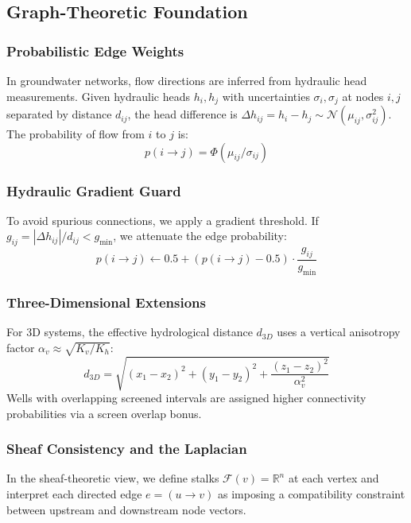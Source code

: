 \documentclass[12pt,a4paper]{article}
\theoremstyle{plain}
\theoremstyle{definition}
\theoremstyle{remark}
\begin{document}
\subsection{Graph-Theoretic Foundation}\label{sec:graph_foundation}

\subsubsection{Probabilistic Edge Weights}
In groundwater networks, flow directions are inferred from hydraulic head measurements. Given hydraulic heads $h_i, h_j$ with uncertainties $\sigma_i, \sigma_j$ at nodes $i, j$ separated by distance $d_{ij}$, the head difference is $\Delta h_{ij} = h_i - h_j \sim \mathcal{N}(\mu_{ij}, \sigma_{ij}^2)$. The probability of flow from $i$ to $j$ is:
\begin{equation}\label{eq:edge_probability}
	p(i \to j) = \Phi(\mu_{ij} / \sigma_{ij})
\end{equation}

\subsubsection{Hydraulic Gradient Guard}
To avoid spurious connections, we apply a gradient threshold. If $g_{ij} = |\Delta h_{ij}|/d_{ij} < g_{\min}$, we attenuate the edge probability:
\begin{equation}\label{eq:gradient_guard}
	p(i \to j) \leftarrow 0.5 + (p(i \to j) - 0.5) \cdot \frac{g_{ij}}{g_{\min}}
\end{equation}

\subsubsection{Three-Dimensional Extensions}
For 3D systems, the effective hydrological distance $d_{3D}$ uses a vertical anisotropy factor $\alpha_v \approx \sqrt{K_v/K_h}$:
\begin{equation}
	d_{3D} = \sqrt{(x_1-x_2)^2 + (y_1-y_2)^2 + \frac{(z_1-z_2)^2}{\alpha_v^2}}
\end{equation}
Wells with overlapping screened intervals are assigned higher connectivity probabilities via a screen overlap bonus.

\subsubsection{Sheaf Consistency and the Laplacian}
In the sheaf-theoretic view, we define stalks $\mathcal{F}(v) = \mathbb{R}^n$ at each vertex and interpret each directed edge $e=(u\to v)$ as imposing a compatibility constraint between upstream and downstream node vectors.
\end{document}
